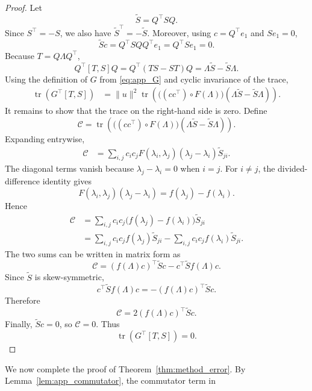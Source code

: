 \documentclass{article}
\begin{document}
\begin{proof}
Let
\[
    \widetilde S = Q^\top S Q .
\]
Since \(S^\top=-S\), we also have \(\widetilde S^\top=-\widetilde S\). Moreover,
using \(c=Q^\top e_1\) and \(Se_1=0\),
\[
    \widetilde S c
    =
    Q^\top S Q Q^\top e_1
    =
    Q^\top S e_1
    =
    0 .
\]
Because \(T=Q\Lambda Q^\top\),
\[
    Q^\top[T,S]Q
    =
    Q^\top(TS-ST)Q
    =
    \Lambda \widetilde S-\widetilde S\Lambda .
\]
Using the definition of \(G\) from \eqref{eq:app_G} and cyclic invariance of the trace,
\begin{align}
    \operatorname{tr}(G^\top[T,S])
    &=
    \|u\|^2
    \operatorname{tr}\!\left(
        \bigl((cc^\top)\circ F(\Lambda)\bigr)
        (\Lambda\widetilde S-\widetilde S\Lambda)
    \right).
\end{align}
It remains to show that the trace on the right-hand side is zero. Define
\[
    \mathcal{C}
    =
    \operatorname{tr}\!\left(
        \bigl((cc^\top)\circ F(\Lambda)\bigr)
        (\Lambda\widetilde S-\widetilde S\Lambda)
    \right).
\]
Expanding entrywise,
\begin{align}
    \mathcal{C}
    &=
    \sum_{i,j}
    c_i c_j F(\lambda_i,\lambda_j)
    (\lambda_j-\lambda_i)\widetilde S_{ji}.
    \label{eq:app_commutator_expansion}
\end{align}
The diagonal terms vanish because \(\lambda_j-\lambda_i=0\) when \(i=j\). For
\(i\neq j\), the divided-difference identity gives
\[
    F(\lambda_i,\lambda_j)(\lambda_j-\lambda_i)
    =
    f(\lambda_j)-f(\lambda_i).
\]
Hence
\begin{align}
    \mathcal{C}
    &=
    \sum_{i,j}
    c_i c_j
    \bigl(f(\lambda_j)-f(\lambda_i)\bigr)
    \widetilde S_{ji} \\
    &=
    \sum_{i,j}
    c_i c_j f(\lambda_j)\widetilde S_{ji}
    -
    \sum_{i,j}
    c_i c_j f(\lambda_i)\widetilde S_{ji}.
\end{align}
The two sums can be written in matrix form as
\[
    \mathcal{C}
    =
    (f(\Lambda)c)^\top \widetilde S c
    -
    c^\top \widetilde S f(\Lambda)c .
\]
Since \(\widetilde S\) is skew-symmetric,
\[
    c^\top \widetilde S f(\Lambda)c
    =
    - (f(\Lambda)c)^\top \widetilde S c .
\]
Therefore
\[
    \mathcal{C}
    =
    2(f(\Lambda)c)^\top \widetilde S c .
\]
Finally, \(\widetilde S c=0\), so \(\mathcal{C}=0\). Thus
\[
    \operatorname{tr}(G^\top[T,S])=0 .
\]
\end{proof}
We now complete the proof of Theorem~\ref{thm:method_error}. By
Lemma~\ref{lem:app_commutator}, the commutator term in
\end{document}
